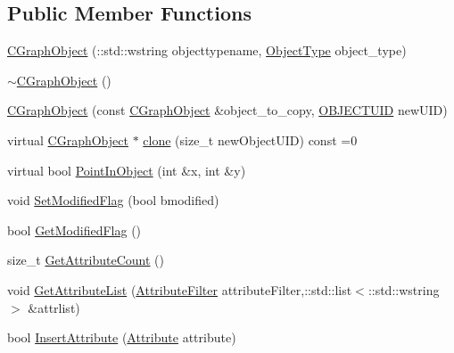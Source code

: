 \subsection*{Public Member Functions}
\begin{DoxyCompactItemize}
\item 
\hyperlink{class_n_m_1_1_o_d_b_1_1_c_graph_object_a06700df2a7c050d93b0accd0e8642369}{C\+Graph\+Object} (\+::std\+::wstring objecttypename, \hyperlink{namespace_n_m_1_1_o_d_b_ac9f60beb4a1c8a6240dd0c8baa281345}{Object\+Type} object\+\_\+type)
\item 
\hyperlink{class_n_m_1_1_o_d_b_1_1_c_graph_object_ae80b46a15e4d793e295f5ee02f66cfe4}{$\sim$\+C\+Graph\+Object} ()
\item 
\hyperlink{class_n_m_1_1_o_d_b_1_1_c_graph_object_a6f43040764eb9614235394fd7054a999}{C\+Graph\+Object} (const \hyperlink{class_n_m_1_1_o_d_b_1_1_c_graph_object}{C\+Graph\+Object} \&object\+\_\+to\+\_\+copy, \hyperlink{namespace_n_m_1_1_o_d_b_a262b64fab56baaa96e18bac4ada88265}{O\+B\+J\+E\+C\+T\+U\+I\+D} new\+U\+I\+D)
\item 
virtual \hyperlink{class_n_m_1_1_o_d_b_1_1_c_graph_object}{C\+Graph\+Object} $\ast$ \hyperlink{class_n_m_1_1_o_d_b_1_1_c_graph_object_aa0ca9ee294c6b42e39fb2c3a6598b506}{clone} (size\+\_\+t new\+Object\+U\+I\+D) const  =0
\item 
virtual bool \hyperlink{class_n_m_1_1_o_d_b_1_1_c_graph_object_a8069a2286005ece610484b60ee8c0fde}{Point\+In\+Object} (int \&x, int \&y)
\item 
void \hyperlink{class_n_m_1_1_o_d_b_1_1_c_graph_object_a32778b91aca24bf7e1f1d06799e7e3c8}{Set\+Modified\+Flag} (bool bmodified)
\item 
bool \hyperlink{class_n_m_1_1_o_d_b_1_1_c_graph_object_ad8daa62d38568f2cc4742245b0b81b20}{Get\+Modified\+Flag} ()
\item 
size\+\_\+t \hyperlink{class_n_m_1_1_o_d_b_1_1_c_graph_object_a8a85ff3c3d04bab0a6affed34c5acfec}{Get\+Attribute\+Count} ()
\item 
void \hyperlink{class_n_m_1_1_o_d_b_1_1_c_graph_object_a60189d19350f322cf73dfa36559bf7d5}{Get\+Attribute\+List} (\hyperlink{namespace_n_m_1_1_o_d_b_a3c1c138c7d11b589aaa8863b6a8c1317}{Attribute\+Filter} attribute\+Filter,\+::std\+::list$<$\+::std\+::wstring $>$ \&attrlist)
\item 
bool \hyperlink{class_n_m_1_1_o_d_b_1_1_c_graph_object_a8c03cd8831fb6912dbfaa8aad56c424b}{Insert\+Attribute} (\hyperlink{class_n_m_1_1_o_d_b_1_1_attribute}{Attribute} attribute)
\item 

\end{DoxyCompactItemize}
